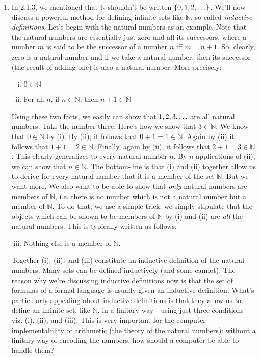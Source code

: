 \begin{enumerate}[{\thesection}.1]

	\item In 2.1.3, we mentioned that $\mathbb{N}$ shouldn't be written $\{0,1,2,\mathellipsis\}$. We'll now discuss a powerful method for defining infinite sets like $\mathbb{N}$, so-called \emph{inductive definitions}. Let's begin with the natural numbers as an example. Note that the natural numbers are essentially just zero and all its successors, where a number $m$ is said to be the successor of a number $n$ iff $m=n+1$. So, clearly, zero is a natural number and if we take a natural  number, then its successor (the result of adding one) is also a natural number. More precisely:	
	\begin{enumerate}[(i)]
	
		\item $0\in \mathbb{N}$
		
		\item For all $n$, if $n\in\mathbb{N}$, then $n+1\in \mathbb{N}$
	
	\end{enumerate}
	
	Using these two facts, we easily can show that $1,2,3, \mathellipsis$ are all natural numbers. Take the number three. Here's how we show that $3\in \mathbb{N}$: We know that $0\in\mathbb{N}$ by (i). By (ii), it follows that $0+1=1\in\mathbb{N}$. Again by (ii) it follows that $1+1=2\in\mathbb{N}$. Finally, again by (ii), it follows that $2+1=3\in \mathbb{N}$. This clearly generalizes to every natural number $n$. By $n$ applications of (ii), we can show that $n\in\mathbb{N}$. The bottom-line is that (i) and (ii) together allow us to derive for every natural number that it is a member of the set $\mathbb{N}$. But we want more. We also want to be able to show that \emph{only} natural numbers are members of $\mathbb{N}$, i.e. there is no number which is not a natural number but a member of $\mathbb{N}$.	 To do that, we use a simple trick: we simply stipulate that the objects which can be shown to be members of $\mathbb{N}$ by (i) and (ii) are \emph{all} the natural numbers. This is typically written as follows:
	\begin{enumerate}[(i)]
	
		\setcounter{enumii}{2}
	
		\item Nothing else is a member of $\mathbb{N}$.
	
	\end{enumerate}
Together (i), (ii), and (iii) constitute an inductive definition of the natural numbers. Many sets can be defined inductively (and some cannot). The reason why we're discussing inductive definitions now is that the set of formulas of a formal language is usually given an inductive definition. What's particularly appealing about inductive definitions is that they allow us to define an infinite set, like $\mathbb{N}$, in a finitary way---using just three conditions viz. (i), (ii), and (iii). This is very important for the computer implementability of arithmetic (the theory of the natural numbers): without a finitary way of encoding the numbers, how should a computer be able to handle them?


\end{enumerate}
